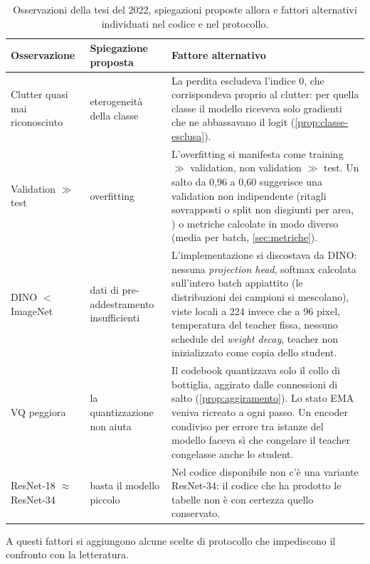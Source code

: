 \begin{table}[t]
  \centering
  \small
  \caption[Osservazioni della tesi del 2022 e fattori alternativi]{Osservazioni della tesi del
    2022, spiegazioni proposte allora e fattori alternativi individuati nel codice e nel
    protocollo.}
  \label{tab:lettura-critica}
  \begin{tabular}{|p{2.6cm}|p{2.6cm}|p{7.2cm}|}
    \hline
    \textbf{Osservazione} & \textbf{Spiegazione proposta} & \textbf{Fattore alternativo} \\
    \hline
    Clutter quasi mai riconosciuto & eterogeneità della classe &
      La perdita escludeva l'indice 0, che corrispondeva proprio al clutter: per quella classe
      il modello riceveva solo gradienti che ne abbassavano il logit
      (\cref{prop:classe-esclusa}). \\
    \hline
    Validation $\gg$ test & overfitting &
      L'overfitting si manifesta come training $\gg$ validation, non validation $\gg$ test. Un
      salto da 0,96 a 0,60 suggerisce una validation non indipendente (ritagli sovrapposti o
      split non disgiunti per area, \cite{kaufman2012leakage}) o metriche calcolate in modo
      diverso (media per batch, \cref{sec:metriche}). \\
    \hline
    DINO $<$ ImageNet & dati di pre-addestramento insufficienti &
      L'implementazione si discostava da DINO: nessuna \emph{projection head}, softmax
      calcolata sull'intero batch appiattito (le distribuzioni dei campioni si mescolano),
      viste locali a 224 invece che a 96 pixel, temperatura del teacher fissa, nessuno schedule
      del \emph{weight decay}, teacher non inizializzato come copia dello student. \\
    \hline
    VQ peggiora & la quantizzazione non aiuta &
      Il codebook quantizzava solo il collo di bottiglia, aggirato dalle connessioni di salto
      (\cref{prop:aggiramento}). Lo stato EMA veniva ricreato a ogni passo. Un encoder
      condiviso per errore tra istanze del modello faceva sì che congelare il teacher
      congelasse anche lo student. \\
    \hline
    ResNet-18 $\approx$ ResNet-34 & basta il modello piccolo &
      Nel codice disponibile non c'è una variante ResNet-34: il codice che ha prodotto le
      tabelle non è con certezza quello conservato. \\
    \hline
  \end{tabular}
\end{table}

A questi fattori si aggiungono alcune scelte di protocollo che impediscono il confronto con la
letteratura.

